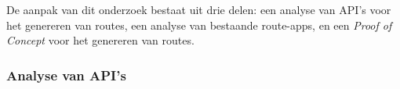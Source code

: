 
\chapter{}%
\label{ch:methodologie}


De aanpak van dit onderzoek bestaat uit drie delen: een analyse van API's voor het genereren van routes, een analyse van bestaande route-apps, en een \emph{Proof of Concept} voor het genereren van routes.

\subsection{Analyse van API's}

